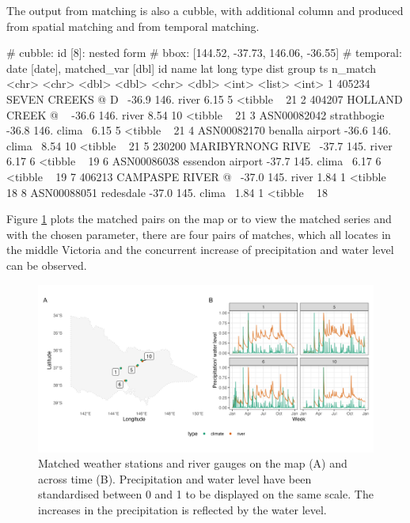 \documentclass[
]{jss}
\begin{document}
The output from matching is also a cubble, with additional column
 and  produced from spatial matching and
 from temporal matching.

\begin{CodeChunk}
\begin{CodeOutput}
# cubble:   id [8]: nested form
# bbox:     [144.52, -37.73, 146.06, -36.55]
# temporal: date [date], matched_var [dbl]
  id          name                lat  long type    dist group ts        n_match
  <chr>       <chr>             <dbl> <dbl> <chr>  <dbl> <int> <list>      <int>
1 405234      SEVEN CREEKS @ D~ -36.9  146. river   6.15     5 <tibble ~      21
2 404207      HOLLAND CREEK @ ~ -36.6  146. river   8.54    10 <tibble ~      21
3 ASN00082042 strathbogie       -36.8  146. clima~  6.15     5 <tibble ~      21
4 ASN00082170 benalla airport   -36.6  146. clima~  8.54    10 <tibble ~      21
5 230200      MARIBYRNONG RIVE~ -37.7  145. river   6.17     6 <tibble ~      19
6 ASN00086038 essendon airport  -37.7  145. clima~  6.17     6 <tibble ~      19
7 406213      CAMPASPE RIVER @~ -37.0  145. river   1.84     1 <tibble ~      18
8 ASN00088051 redesdale         -37.0  145. clima~  1.84     1 <tibble ~      18
\end{CodeOutput}
\end{CodeChunk}

Figure \ref{fig:matching} plots the matched pairs on the map or to view
the matched series and with the chosen parameter, there are four pairs
of matches, which all locates in the middle Victoria and the concurrent
increase of precipitation and water level can be observed.

\begin{CodeChunk}
\begin{figure}

{\centering \includegraphics[width=1\linewidth]{figures/matching} 

}

\caption[Matched weather stations and river gauges on the map (A) and across time (B)]{Matched weather stations and river gauges on the map (A) and across time (B). Precipitation and water level have been standardised between 0 and 1 to be displayed on the same scale. The increases in the precipitation is reflected by the water level.}\label{fig:matching}
\end{figure}
\end{CodeChunk}
\end{document}
